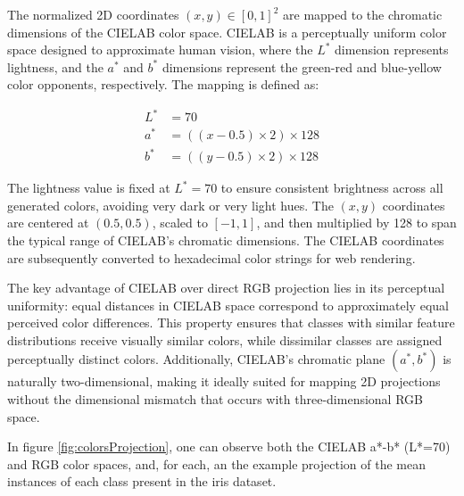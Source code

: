 The normalized 2D coordinates $(x, y) \in [0, 1]^2$ are mapped to the chromatic dimensions of the CIELAB color space. CIELAB is a perceptually uniform color space designed to approximate human vision, where the $L^*$ dimension represents lightness, and the $a^*$ and $b^*$ dimensions represent the green-red and blue-yellow color opponents, respectively. The mapping is defined as:

\begin{equation}
\begin{aligned}
L^* &= 70 \\
a^* &= ((x - 0.5) \times 2) \times 128 \\
b^* &= ((y - 0.5) \times 2) \times 128
\end{aligned}
\end{equation}

The lightness value is fixed at $L^* = 70$ to ensure consistent brightness across all generated colors, avoiding very dark or very light hues. The $(x, y)$ coordinates are centered at $(0.5, 0.5)$, scaled to $[-1, 1]$, and then multiplied by 128 to span the typical range of CIELAB's chromatic dimensions.
The CIELAB coordinates are subsequently converted to hexadecimal color strings for web rendering.

The key advantage of CIELAB over direct RGB projection lies in its perceptual uniformity: equal distances in CIELAB space correspond to approximately equal perceived color differences. This property ensures that classes with similar feature distributions receive visually similar colors, while dissimilar classes are assigned perceptually distinct colors. Additionally, CIELAB's chromatic plane $(a^*, b^*)$ is naturally two-dimensional, making it ideally suited for mapping 2D projections without the dimensional mismatch that occurs with three-dimensional RGB space.

In figure \ref{fig:colorsProjection}, one can observe both the CIELAB a*-b* (L*=70) and RGB color spaces, and, for each, an the example projection of the mean instances of each class present in the iris dataset.

